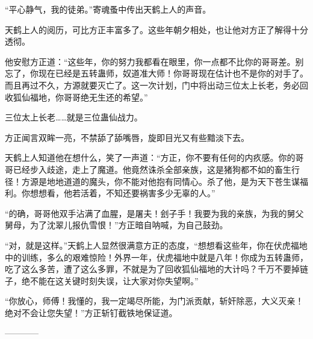 \begin{this_body}
“平心静气，我的徒弟。”寄魂蚤中传出天鹤上人的声音。

天鹤上人的阅历，可比方正丰富多了。这些年朝夕相处，也让他对方正了解得十分透彻。

他安慰方正道：“这些年，你的努力我都看在眼里，你一点都不比你的哥哥差。别忘了，你现在已经是五转蛊师，奴道准大师！你哥哥现在估计也不是你的对手了。而且再过不久，方源就要灭亡了。这一次计划，门中将出动三位太上长老，务必回收狐仙福地，你哥哥绝无生还的希望。”

三位太上长老……就是三位蛊仙战力。

方正闻言双眸一亮，不禁舔了舔嘴唇，旋即目光又有些黯淡下去。

天鹤上人知道他在想什么，笑了一声道：“方正，你不要有任何的内疚感。你的哥哥已经步入歧途，走上了魔道。他竟然诛杀全部亲族，这是猪狗都不如的畜生行径！方源是地地道道的魔头，你不能对他抱有同情心。杀了他，是为天下苍生谋福利。你想想看，他若活着，不知还要祸害多少无辜的人。”

“的确，哥哥他双手沾满了血腥，是屠夫！刽子手！我要为我的亲族，为我的舅父舅母，为了沈翠儿报仇雪恨！”方正暗自呐喊，为自己鼓劲。

“对，就是这样。”天鹤上人显然很满意方正的态度，“想想看这些年，你在伏虎福地中的训练，多么的艰难惊险！外界一年，伏虎福地中就是八年！你成为五转蛊师，吃了这么多苦，遭了这么多罪，不就是为了回收狐仙福地的大计吗？千万不要掉链子，绝不能在这关键时刻失误，让大家对你失望啊。”

“你放心，师傅！我懂的，我一定竭尽所能，为门派贡献，斩奸除恶，大义灭亲！绝对不会让您失望！”方正斩钉截铁地保证道。

------------

\end{this_body}

